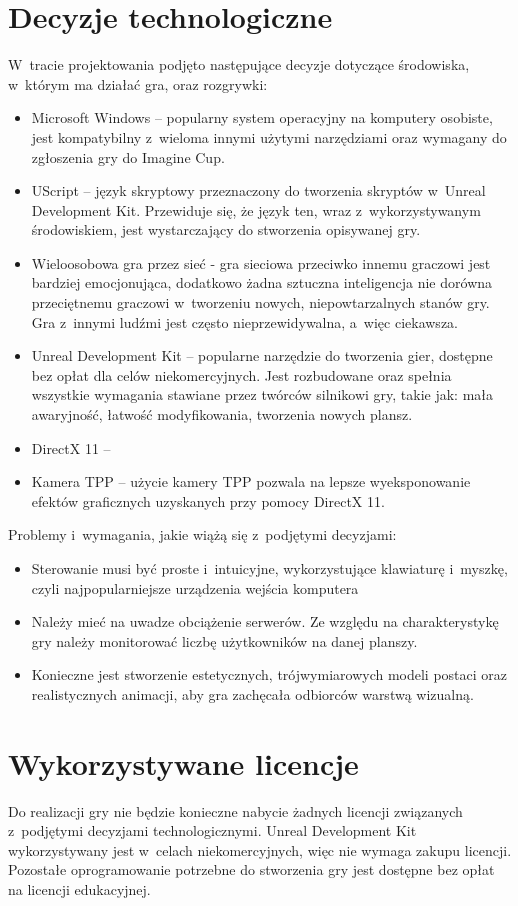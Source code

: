 \section{Decyzje technologiczne}
W~tracie projektowania podjęto następujące decyzje dotyczące środowiska, w~którym ma działać gra, oraz rozgrywki:
\begin{itemize}
\item Microsoft Windows -- popularny system operacyjny na komputery osobiste, jest kompatybilny z~wieloma innymi użytymi narzędziami oraz wymagany do zgłoszenia gry do Imagine Cup.
\item UScript -- język skryptowy przeznaczony do tworzenia skryptów w~Unreal Development Kit. Przewiduje się, że język ten, wraz z~wykorzystywanym środowiskiem, jest wystarczający do stworzenia opisywanej gry.
\item Wieloosobowa gra przez sieć - gra sieciowa przeciwko innemu graczowi jest bardziej emocjonująca, dodatkowo żadna sztuczna inteligencja nie dorówna przeciętnemu graczowi w~tworzeniu nowych, niepowtarzalnych stanów gry. Gra z~innymi ludźmi jest często nieprzewidywalna, a~więc ciekawsza.
\item Unreal Development Kit -- popularne narzędzie do tworzenia gier, dostępne bez opłat dla celów niekomercyjnych. Jest rozbudowane oraz spełnia wszystkie wymagania stawiane przez twórców silnikowi gry, takie jak: mała awaryjność, łatwość modyfikowania, tworzenia nowych plansz.
\item DirectX 11 --
\item Kamera TPP -- użycie kamery TPP pozwala na lepsze wyeksponowanie efektów graficznych uzyskanych przy pomocy DirectX 11.
\end{itemize}

Problemy i~wymagania, jakie wiążą się z~podjętymi decyzjami:
\begin{itemize}
\item Sterowanie musi być proste i~intuicyjne, wykorzystujące klawiaturę i~myszkę, czyli najpopularniejsze urządzenia wejścia komputera
\item Należy mieć na uwadze obciążenie serwerów. Ze względu na charakterystykę gry należy monitorować liczbę użytkowników na danej planszy.
\item Konieczne jest stworzenie estetycznych, trójwymiarowych modeli postaci oraz realistycznych animacji, aby gra zachęcała odbiorców warstwą wizualną.
\end{itemize}

\section{Wykorzystywane licencje}
Do realizacji gry nie będzie konieczne nabycie żadnych licencji związanych z~podjętymi decyzjami technologicznymi. Unreal Development Kit wykorzystywany jest w~celach niekomercyjnych, więc nie wymaga zakupu licencji. Pozostałe oprogramowanie potrzebne do stworzenia gry jest dostępne bez opłat na licencji edukacyjnej.

